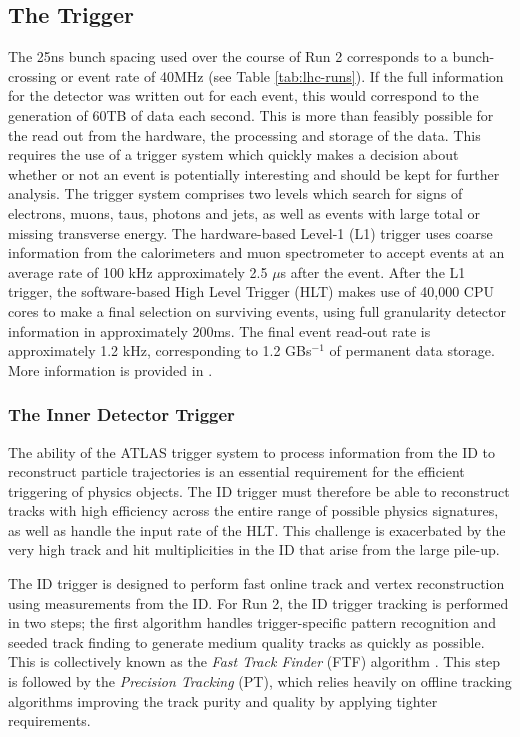 \subsection{The Trigger}
The 25ns bunch spacing used over the course of Run 2 corresponds to a bunch-crossing or event rate of 40MHz (see Table \ref{tab:lhc-runs}). If the full information for the detector was written out for each event, this would correspond to the generation of 60TB of data each second. This is more than feasibly possible for the read out from the hardware, the processing and storage of the data. This requires the use of a trigger system which quickly makes a decision about whether or not an event is potentially interesting and should be kept for further analysis. The trigger system comprises two levels which search for signs of electrons, muons, taus, photons and jets, as well as events with large total or missing transverse energy. The hardware-based Level-1 (L1) trigger uses coarse information from the calorimeters and muon spectrometer to accept events at an average rate of 100 kHz approximately 2.5 $\mu$s after the event. After the L1 trigger, the software-based High Level Trigger (HLT) makes use of 40,000 CPU cores to make a final selection on surviving events, using full granularity detector information in approximately 200ms. The final event read-out rate is approximately 1.2 kHz, corresponding to 1.2 GBs$^{-1}$ of permanent data storage. More information is provided in \cite{TRIG-2016-01}.


\subsubsection{The Inner Detector Trigger}

The ability of the ATLAS trigger system to process information from the ID to reconstruct particle trajectories is an essential requirement for the efficient triggering of physics objects. The ID trigger must therefore be able to reconstruct tracks with high efficiency across the entire range of possible physics signatures, as well as handle the input rate of the HLT. This challenge is exacerbated by the very high track and hit multiplicities in the ID that arise from the large pile-up. 

The ID trigger is designed to perform fast online track and vertex reconstruction using measurements from the ID. For Run 2, the ID trigger tracking is performed in two steps; the first algorithm handles trigger-specific pattern recognition and seeded track finding to generate medium quality tracks as quickly as possible. This is collectively known as the \textit{Fast Track Finder} (FTF) algorithm \cite{Penc:2104217, Grandi:2624768}. This step is followed by the \textit{Precision Tracking} (PT), which relies heavily on offline tracking algorithms \cite{T_Cornelissen_2008} improving the track purity and quality by applying tighter requirements. 




